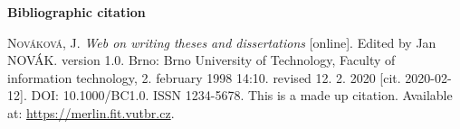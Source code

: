 \bigskip

\noindent \textbf{Bibliographic citation}

\medskip

\noindent \textsc{Nováková}, J. \textit{Web on writing theses and dissertations} [online]. Edited by Jan NOVÁK. version 1.0. Brno: Brno University of Technology, Faculty of information technology, 2. february 1998 14:10. revised 12. 2. 2020 [cit. 2020-02-12]. DOI: 10.1000/BC1.0. ISSN 1234-5678. This is a made up citation. Available at: \url{https://merlin.fit.vutbr.cz}.